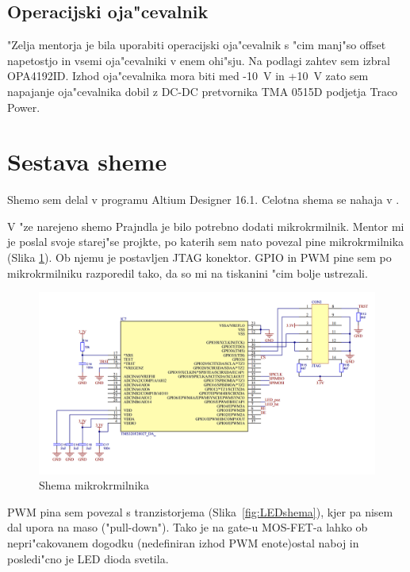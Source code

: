\documentclass[a4paper]{article}
\begin{document}
\subsection{Operacijski oja"cevalnik}

"Zelja mentorja je bila uporabiti operacijski oja"cevalnik s "cim manj"so offset napetostjo in vsemi oja"cevalniki v enem ohi"sju. Na podlagi zahtev sem izbral OPA4192ID. Izhod oja"cevalnika mora biti med -10~V in +10~V zato sem napajanje oja"cevalnika dobil z DC-DC pretvornika TMA 0515D podjetja Traco Power.  



\section{Sestava sheme}
\label{shema}
Shemo sem delal v programu Altium Designer 16.1. Celotna shema se nahaja v .




V "ze narejeno shemo Prajndla je bilo potrebno dodati mikrokrmilnik. Mentor mi je poslal svoje starej"se projkte, po katerih sem nato povezal pine mikrokrmilnika (Slika \ref{fig:uCshema}). Ob njemu je postavljen JTAG konektor. GPIO in PWM pine sem po mikrokrmilniku razporedil tako, da so mi na tiskanini "cim bolje ustrezali.
	\begin{figure}[h!]
		\centering
		\includegraphics[width=\textwidth]{uC.png}
		\caption{Shema mikrokrmilnika}
		\label{fig:uCshema}
	\end{figure}


PWM pina sem povezal s tranzistorjema (Slika~\ref{fig:LEDshema}), kjer pa nisem dal upora na maso ("pull-down"). Tako je na gate-u MOS-FET-a lahko ob nepri"cakovanem dogodku (nedefiniran izhod PWM enote)ostal naboj in posledi"cno je LED dioda svetila.
\end{document}
